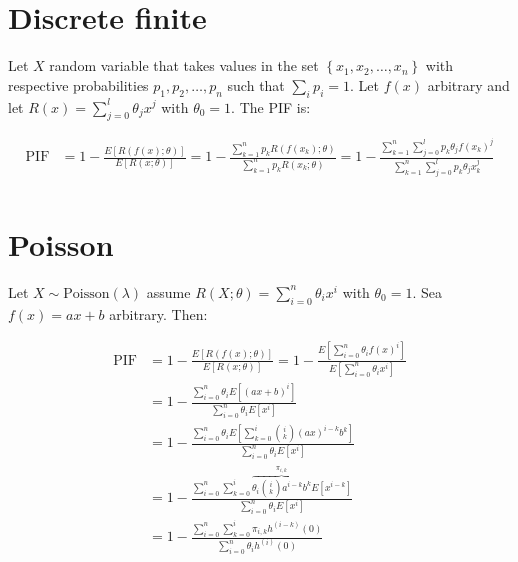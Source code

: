 \documentclass{article}
\begin{document}
\section{Discrete finite}

Let $X$ random variable that takes values in the set $\left \{ x_1, x_2, \dots, x_n \right \}$  with respective probabilities $p_1, p_2, \dots, p_n$ such that $\sum_{i} p_i = 1$. Let $f(x)$ arbitrary and let $R(x) = \sum\limits_{j = 0}^{l} \theta_j x^j$ with $\theta_0 = 1$. The PIF is:

\begin{equation}
\begin{aligned}
    \textrm{PIF} & = 1 - \frac{E\left[ R\left( f(x); \theta \right) \right]}{E\left[ R(x; \theta) \right]} = 1 -\frac{ \sum\limits_{k = 1}^{n} p_k R\left( f(x_k); \theta \right) }{\sum\limits_{k = 1}^{n} p_k R\left( x_k; \theta \right) }  = 1 - \frac{ \sum\limits_{k = 1}^{n} \sum\limits_{j = 0}^{l} p_k \theta_j f(x_k)^j }{\sum\limits_{k = 1}^{n}  \sum\limits_{j = 0}^{l} p_k \theta_j x_k^j } \\
\end{aligned}
\end{equation}

\section{Poisson}

Let $X \sim \textrm{Poisson}(\lambda)$ assume $R(X;\theta) = \sum\limits_{i = 0}^{n} \theta_i x^i$ with $\theta_0 = 1$. Sea $f(x) = ax + b$ arbitrary. Then: 

\begin{equation}
\begin{aligned}
 \textrm{PIF} & = 1 - \frac{E\left[ R\left( f(x); \theta \right) \right]}{E\left[ R(x; \theta) \right]} = 1 - \frac{E \left[ \sum\limits_{i = 0}^{n} \theta_i f(x)^i \right] }{E \left[ \sum\limits_{i = 0}^{n} \theta_i x^i \right]} \\
 & = 1 - \frac{ \sum\limits_{i = 0}^{n} \theta_i  E \left[ (ax + b)^i \right] }{\sum\limits_{i = 0}^{n} \theta_i E \left[   x^i \right]} \\
 & = 1 - \frac{ \sum\limits_{i = 0}^{n} \theta_i  E \left[ \sum\limits_{k = 0}^{i} {i \choose k} (ax)^{i - k} b^k \right] }{\sum\limits_{i = 0}^{n} \theta_i E \left[   x^i \right]} \\
 & = 1 - \frac{ \sum\limits_{i = 0}^{n}  \sum\limits_{k = 0}^{i}  \overbrace{ \theta_i  {i \choose k} a^{i-k} b^k}^{\pi_{i,k}} E \left[ x^{i - k}  \right] }{\sum\limits_{i = 0}^{n} \theta_i E \left[   x^i \right]}
 \\ 
 & = 1 - \frac{ \sum\limits_{i = 0}^{n}  \sum\limits_{k = 0}^{i}  \pi_{i,k} h^{(i - k)} (0)  }{\sum\limits_{i = 0}^{n} \theta_i  h^{(i )} (0) }
\end{aligned}
\end{equation}
\end{document}
